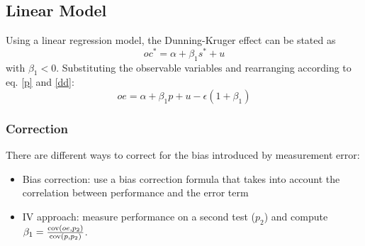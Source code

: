 \subsection{Linear Model}
Using a linear regression model, the Dunning-Kruger effect can be stated as
\begin{equation}
 oc^* = \alpha + \beta_1 s^* + u
\end{equation}
with $\beta_1 < 0$.
Substituting the observable variables and rearranging according to eq. \ref{p} and \ref{dd}:
\begin{equation}
  oe = \alpha + \beta_1 p + u - \epsilon(1 + \beta_1)
\end{equation}

\subsubsection{Correction}
There are different ways to correct for the bias introduced by measurement error:
\begin{itemize}
 \item Bias correction: use a bias correction formula that takes into account the correlation between performance and the error term
 \item IV approach: measure performance on a second test ($p_2$) and compute $\beta_1 = \frac{\operatorname{cov}(oe, p_2)}{\operatorname{cov}(p, p_2)}$.
\end{itemize}
